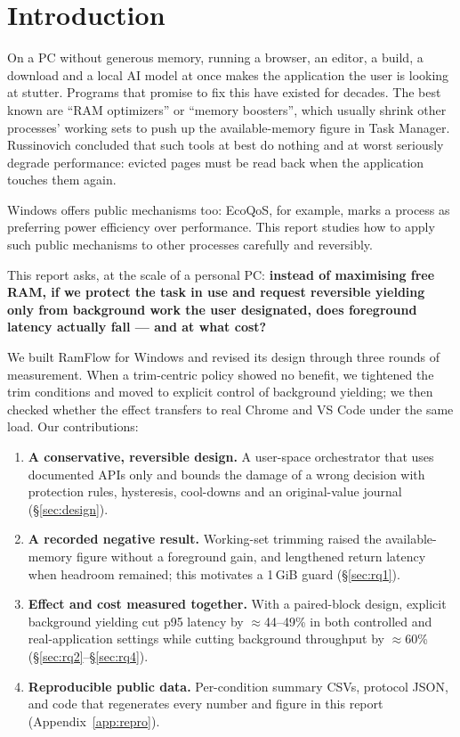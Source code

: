 \documentclass[11pt]{article}
\begin{document}
\section{Introduction}
\label{sec:intro}

On a PC without generous memory, running a browser, an editor, a build, a download and a local AI model at once makes the application the user is looking at stutter. Programs that promise to fix this have existed for decades. The best known are ``RAM optimizers'' or ``memory boosters'', which usually shrink other processes' working sets to push up the available-memory figure in Task Manager. Russinovich concluded that such tools at best do nothing and at worst seriously degrade performance\citep{russinovich2004}: evicted pages must be read back when the application touches them again\citep{mswset}.

Windows offers public mechanisms too: EcoQoS, for example, marks a process as preferring power efficiency over performance\citep{ecoqos2021}. This report studies how to apply such public mechanisms to other processes carefully and reversibly.

This report asks, at the scale of a personal PC: \textbf{instead of maximising free RAM, if we protect the task in use and request reversible yielding only from background work the user designated, does foreground latency actually fall --- and at what cost?}

We built RamFlow for Windows and revised its design through three rounds of measurement. When a trim-centric policy showed no benefit, we tightened the trim conditions and moved to explicit control of background yielding; we then checked whether the effect transfers to real Chrome and VS Code under the same load. Our contributions:

\begin{enumerate}
  \item \textbf{A conservative, reversible design.} A user-space orchestrator that uses documented APIs only and bounds the damage of a wrong decision with protection rules, hysteresis, cool-downs and an original-value journal (\S\ref{sec:design}).
  \item \textbf{A recorded negative result.} Working-set trimming raised the available-memory figure without a foreground gain, and lengthened return latency when headroom remained; this motivates a 1\,GiB guard (\S\ref{sec:rq1}).
  \item \textbf{Effect and cost measured together.} With a paired-block design, explicit background yielding cut p95 latency by $\approx$44--49\% in both controlled and real-application settings while cutting background throughput by $\approx$60\% (\S\ref{sec:rq2}--\S\ref{sec:rq4}).
  \item \textbf{Reproducible public data.} Per-condition summary CSVs, protocol JSON, and code that regenerates every number and figure in this report (Appendix~\ref{app:repro}).
\end{enumerate}
\end{document}

